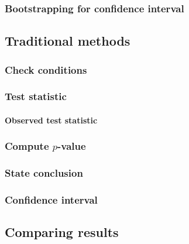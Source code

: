 \documentclass[12pt, krantz2,]{krantz}
\let\oldparagraph\paragraph
\renewcommand{\paragraph}[1]{\oldparagraph{#1}\mbox{}}
\begin{document}
\hypertarget{bootstrapping-for-confidence-interval}{%
\subsubsection*{Bootstrapping for confidence interval}\label{bootstrapping-for-confidence-interval}}


\hypertarget{traditional-methods}{%
\subsection{Traditional methods}\label{traditional-methods}}

\hypertarget{check-conditions}{%
\subsubsection*{Check conditions}\label{check-conditions}}


\hypertarget{test-statistic}{%
\subsubsection*{Test statistic}\label{test-statistic}}


\hypertarget{observed-test-statistic}{%
\paragraph{Observed test statistic}\label{observed-test-statistic}}

\hypertarget{compute-p-value}{%
\subsubsection*{\texorpdfstring{Compute \(p\)-value}{Compute p-value}}\label{compute-p-value}}


\hypertarget{state-conclusion}{%
\subsubsection*{State conclusion}\label{state-conclusion}}


\hypertarget{confidence-interval}{%
\subsubsection*{Confidence interval}\label{confidence-interval}}


\hypertarget{comparing-results}{%
\subsection{Comparing results}\label{comparing-results}}
\end{document}
